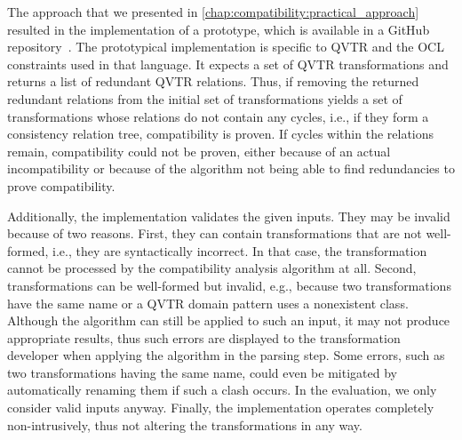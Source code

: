 The approach that we presented in \autoref{chap:compatibility:practical_approach} resulted in the implementation of a prototype, which is available in a GitHub repository~\cite{decompositionGithub}.
%
The prototypical implementation is specific to \gls{QVTR} and the \gls{OCL} constraints used in that language.
It expects a set of \gls{QVTR} transformations and returns a list of redundant \gls{QVTR} relations.
Thus, if removing the returned redundant relations from the initial set of transformations yields a set of transformations whose relations do not contain any cycles, i.e., if they form a consistency relation tree, compatibility is proven.
If cycles within the relations remain, compatibility could not be proven, either because of an actual incompatibility or because of the algorithm not being able to find redundancies to prove compatibility.

Additionally, the implementation validates the given inputs.
They may be invalid because of two reasons.
First, they can contain transformations that are not well-formed, i.e., they are syntactically incorrect. In that case, the transformation cannot be processed by the compatibility analysis algorithm at all.
Second, transformations can be well-formed but invalid, e.g., because two transformations have the same name or a \gls{QVTR} domain pattern uses a nonexistent class.
Although the algorithm can still be applied to such an input, it may not produce appropriate results, thus such errors are displayed to the transformation developer when applying the algorithm in the parsing step.
Some errors, such as two transformations having the same name, could even be mitigated by automatically renaming them if such a clash occurs.
In the evaluation, we only consider valid inputs anyway.
Finally, the implementation operates completely non-intrusively, thus not altering the transformations in any way.

